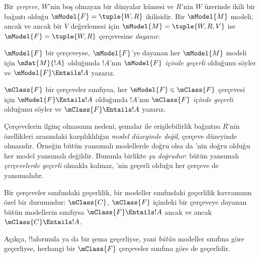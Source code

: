 \documentclass[../../../include/open-logic-section]{subfiles}
\begin{document}


\begin{defn}
  Bir \emph{çerçeve}, $W$'nin boş olmayan bir dünyalar kümesi ve $R$'nin
  $W$ üzerinde ikili bir bağıntı olduğu $\mModel{F}=\tuple{W,R}$ ikilisidir.
  Bir $\mModel{M}$ modeli, ancak ve ancak bir $V$ değerlemesi için
  $\mModel{M}=\tuple{W,R,V}$ ise $\mModel{F}=\tuple{W,R}$ çerçevesine
  \emph{dayanır}.
\end{defn}

\begin{defn}
  $\mModel{F}$ bir çerçeveyse, $\mModel{F}$'ye dayanan her
  $\mModel{M}$ modeli için $\mSat{M}{!A}$ olduğunda $!A$'nın
  \emph{$\mModel{F}$ içinde geçerli} olduğunu söyler ve
  $\mModel{F}\Entails !A$ yazarız.

  $\mClass{F}$ bir çerçeveler sınıfıysa, her $\mModel{F}\in\mClass{F}$
  çerçevesi için $\mModel{F}\Entails !A$ olduğunda $!A$'nın
  \emph{$\mClass{F}$ içinde geçerli} olduğunu söyler ve
  $\mClass{F}\Entails !A$ yazarız.
\end{defn}

Çerçevelerin ilginç olmasının nedeni, şemalar ile erişilebilirlik
bağıntısı $R$'nin özellikleri arasındaki karşılıklılığın
\emph{model düzeyinde değil}, çerçeve düzeyinde olmasıdır. Örneğin  bütün yansımalı
modellerde doğru olsa da 'nin doğru olduğu her model yansımalı
değildir. Bununla birlikte \emph{şu doğrudur}:  bütün yansımalı
\emph{çerçevelerde} \emph{geçerli} olmakla kalmaz, 'nin geçerli olduğu
her çerçeve de yansımalıdır.

\begin{rem}
Bir çerçeveler sınıfındaki geçerlilik, bir modeller sınıfındaki geçerlilik
kavramının özel bir durumudur: $\mClass{C}$, $\mClass{F}$ içindeki bir
çerçeveye dayanan bütün modellerin sınıfıysa $\mClass{F}\Entails !A$ ancak
ve ancak $\mClass{C}\Entails !A$.

Açıkça, !!a{formula} ya da bir şema geçerliyse, yani \emph{bütün}
modeller sınıfına göre geçerliyse, herhangi bir $\mClass{F}$ çerçeveler
sınıfına göre de geçerlidir.
\end{rem}
\end{document}
